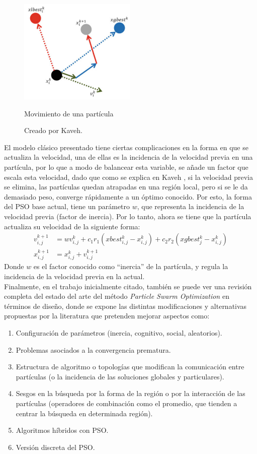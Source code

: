 \begin{figure}[h!]
    \centering    
    \includegraphics[height=50mm]{figures/move_particle.png} 
    \caption{Movimiento de una partícula}
    \vspace{-.25cm} 
    \caption*{Creado por Kaveh\cite{Psoexplain14}.}
    \label{fig:move_part}
\end{figure}
El modelo clásico presentado tiene ciertas complicaciones en la forma en que se actualiza la velocidad, una de ellas es la incidencia de la velocidad previa en una partícula, por lo que a modo de balancear esta variable, se añade un factor que escala esta velocidad, dado que como se explica en Kaveh \cite{Psoexplain14}, si la velocidad previa se elimina, las partículas quedan atrapadas en una región local, pero si se le da demasiado peso, converge rápidamente a un óptimo conocido. Por esto, la forma del PSO base actual, tiene un parámetro $w$, que representa la incidencia de la velocidad previa (factor de inercia). Por lo tanto, ahora se tiene que la partícula actualiza su velocidad de la siguiente forma: 
\begin{align}\label{eq:PSO}
    v_{i,j}^{k+1} &= wv_{i,j}^{k} + c_{1}r_{1}(xbest_{i,j}^k - x_{i,j}^k) + c_{2}r_{2}(xgbest_{j}^{k} - x_{i,j}^k)\\
    x_{i,j}^{k+1} &= x_{i,j}^{k} + v_{i,j}^{k+1}
\end{align}    
Donde $w$ es el factor conocido como ``inercia'' de la partícula, y regula la incidencia de la velocidad previa en la actual.\\
Finalmente, en el trabajo inicialmente citado, también se puede ver una revisión completa del estado del arte del método \emph{Particle Swarm Optimization} en términos de diseño, donde se expone las distintas modificaciones y alternativas propuestas por la literatura que pretenden mejorar aspectos como:
\begin{enumerate}
    \item  Configuración de parámetros (inercia, cognitivo, social, aleatorios).
    \item  Problemas asociados a la convergencia prematura.
    \item  Estructura de algoritmo o topologías que modifican la comunicación entre partículas (o la incidencia de las soluciones globales y particulares).
    \item  Sesgos en la búsqueda por la forma de la región o por la interacción de las partículas (operadores de combinación como el promedio, que tienden a centrar la búsqueda en determinada región).
    \item  Algoritmos híbridos con PSO.
    \item  Versión discreta del PSO. 
\end{enumerate}  

